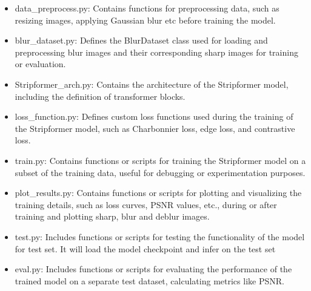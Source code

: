 \documentclass[12pt, a4paper, twoside]{article}
\begin{document}
				\begin{itemize}
					\item data\_preprocess.py: Contains functions for preprocessing data, such as resizing images, applying Gaussian blur etc before training the model.
					
					\item blur\_dataset.py:
					Defines the BlurDataset class used for loading and preprocessing blur images and their corresponding sharp images for training or evaluation.
					
					\item Stripformer\_arch.py:
					Contains the architecture of the Stripformer model, including the definition of transformer blocks.
					
					\item loss\_function.py: Defines custom loss functions used during the training of the Stripformer model, such as Charbonnier loss, edge loss, and contrastive loss.
					
					\item train.py: Contains functions or scripts for training the Stripformer model on a subset of the training data, useful for debugging or experimentation purposes.
					
					\item plot\_results.py: Contains functions or scripts for plotting and visualizing the training details, such as loss curves, PSNR values, etc., during or after training and plotting sharp, blur and deblur images.			
					
					\item test.py: Includes functions or scripts for testing the functionality of the model for test set. It will load the model checkpoint and infer on the test set
					
					\item eval.py: Includes functions or scripts for evaluating the performance of the trained model on a separate test dataset, calculating metrics like PSNR.
					
				\end{itemize}
\end{document}
